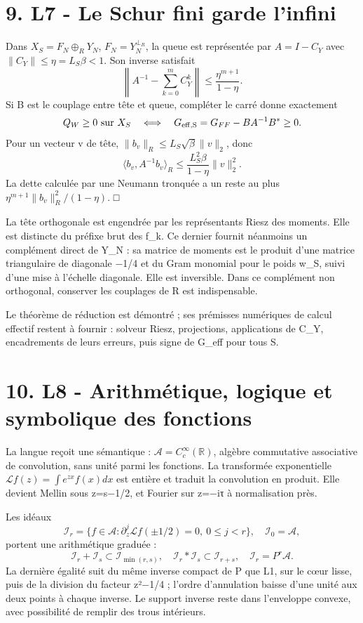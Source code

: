 \documentclass[
  10pt,
  a4paper,
]{article}
\begin{document}
\hypertarget{l7---le-schur-fini-garde-linfini}{%
\section{9. L7 - Le Schur fini garde
l'infini}\label{l7---le-schur-fini-garde-linfini}}

Dans \(X_S=F_N\oplus_RY_N\), \(F_N=Y_N^{\perp_R}\), la queue est
représentée par \(A=I-C_Y\) avec \(\|C_Y\|\le\eta=L_S\beta<1\). Son
inverse satisfait \[
\left\|A^{-1}-\sum_{k=0}^mC_Y^k\right\|
\le\frac{\eta^{m+1}}{1-\eta}.
\] Si B est le couplage entre tête et queue, compléter le carré donne
exactement \[
Q_W\ge0\text{ sur }X_S\quad\Longleftrightarrow\quad
G_{\rm eff,S}=G_{FF}-B A^{-1}B^*\ge0.
\] Pour un vecteur v de tête, \(\|b_v\|_R\le L_S\sqrt\beta\|v\|_2\),
donc \[
\langle b_v,A^{-1}b_v\rangle_R
\le\frac{L_S^2\beta}{1-\eta}\|v\|_2^2.
\] La dette calculée par une Neumann tronquée a un reste au plus
\(\eta^{m+1}\|b_v\|_R^2/(1-\eta)\). □

La tête orthogonale est engendrée par les représentants Riesz des
moments. Elle est distincte du préfixe brut des f\_k. Ce dernier fournit
néanmoins un complément direct de Y\_N : sa matrice de moments est le
produit d'une matrice triangulaire de diagonale −1/4 et du Gram monomial
pour le poids w\_S, suivi d'une mise à l'échelle diagonale. Elle est
inversible. Dans ce complément non orthogonal, conserver les couplages
de R est indispensable.

Le théorème de réduction est démontré ; ses prémisses numériques de
calcul effectif restent à fournir : solveur Riesz, projections,
applications de C\_Y, encadrements de leurs erreurs, puis signe de
G\_eff pour tous S.

\hypertarget{l8---arithmuxe9tique-logique-et-symbolique-des-fonctions}{%
\section{10. L8 - Arithmétique, logique et symbolique des
fonctions}\label{l8---arithmuxe9tique-logique-et-symbolique-des-fonctions}}

La langue reçoit une sémantique : \(\mathcal A=C_c^\infty(\mathbb R)\),
algèbre commutative associative de convolution, sans unité parmi les
fonctions. La transformée exponentielle
\(\mathscr Lf(z)=\int e^{zx}f(x)dx\) est entière et traduit la
convolution en produit. Elle devient Mellin sous z=s−1/2, et Fourier sur
z=−iτ à normalisation près.

Les idéaux \[
\mathcal I_r=\{f\in\mathcal A:\partial_z^j\mathscr Lf(\pm1/2)=0,
\ 0\le j<r\},\quad\mathcal I_0=\mathcal A,
\] portent une arithmétique graduée : \[
\mathcal I_r+\mathcal I_s\subset\mathcal I_{\min(r,s)},\quad
\mathcal I_r*\mathcal I_s\subset\mathcal I_{r+s},\quad
\mathcal I_r=P^r\mathcal A.
\] La dernière égalité suit du même inverse compact de P que L1, sur le
cœur lisse, puis de la division du facteur z²−1/4 ; l'ordre d'annulation
baisse d'une unité aux deux points à chaque inverse. Le support inverse
reste dans l'enveloppe convexe, avec possibilité de remplir des trous
intérieurs.
\end{document}

